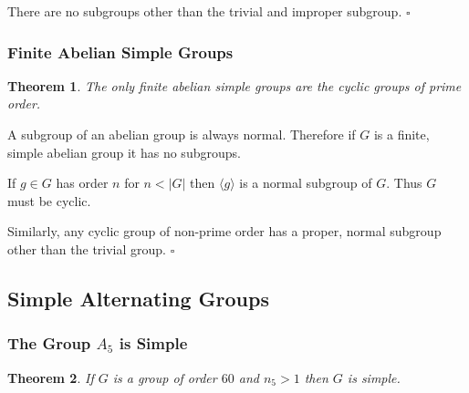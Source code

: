 \documentclass[10pt]{article}
\newtheorem{theorem}{Theorem}[section]
\newenvironment{proof}[1][Proof]{\begin{trivlist}
\item[\hskip \labelsep {\itshape #1}]}{\end{trivlist}}
\begin{document}
\begin{proof}
There are no subgroups other than the trivial and improper subgroup. $\square$
\end{proof}

\subsubsection{Finite Abelian Simple Groups}

\begin{theorem}
The only finite abelian simple groups are the cyclic groups of prime order.
\end{theorem}

\begin{proof}
A subgroup of an abelian group is always normal. Therefore if $G$ is a finite, simple abelian group it has no subgroups.

If $g \in G$ has order $n$ for $n < |G|$ then $\langle g \rangle$ is a normal subgroup of $G$. Thus $G$ must be cyclic.

Similarly, any cyclic group of non-prime order has a proper, normal subgroup other than the trivial group. $\square$
\end{proof}

\subsection{Simple Alternating Groups}

\subsubsection{The Group $A_5$ is Simple}

\begin{theorem}
If $G$ is a group of order $60$ and $n_5 > 1$ then $G$ is simple.
\end{theorem}
\end{document}
